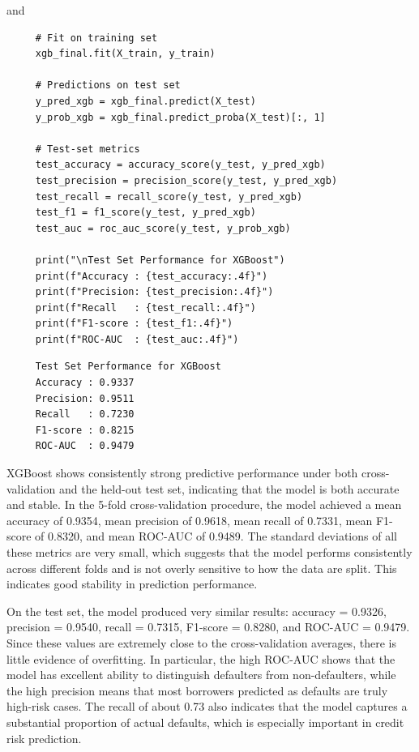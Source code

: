 \documentclass[letterpaper]{article}
\begin{document}
	and 
	
	\begin{lstlisting}
     # Fit on training set
     xgb_final.fit(X_train, y_train)
     
     # Predictions on test set
     y_pred_xgb = xgb_final.predict(X_test)
     y_prob_xgb = xgb_final.predict_proba(X_test)[:, 1]
     
     # Test-set metrics
     test_accuracy = accuracy_score(y_test, y_pred_xgb)
     test_precision = precision_score(y_test, y_pred_xgb)
     test_recall = recall_score(y_test, y_pred_xgb)
     test_f1 = f1_score(y_test, y_pred_xgb)
     test_auc = roc_auc_score(y_test, y_prob_xgb)
     
     print("\nTest Set Performance for XGBoost")
     print(f"Accuracy : {test_accuracy:.4f}")
     print(f"Precision: {test_precision:.4f}")
     print(f"Recall   : {test_recall:.4f}")
     print(f"F1-score : {test_f1:.4f}")
     print(f"ROC-AUC  : {test_auc:.4f}")
	\end{lstlisting}
	
	
	\begin{minipage}{\linewidth}
		\begin{Verbatim}
     Test Set Performance for XGBoost
     Accuracy : 0.9337
     Precision: 0.9511
     Recall   : 0.7230
     F1-score : 0.8215
     ROC-AUC  : 0.9479
		\end{Verbatim}
	\end{minipage}
	XGBoost shows consistently strong predictive performance under both cross-validation and the held-out test set, indicating that the model is both accurate and stable. In the 5-fold cross-validation procedure, the model achieved a mean accuracy of 0.9354, mean precision of 0.9618, mean recall of 0.7331, mean F1-score of 0.8320, and mean ROC-AUC of 0.9489. The standard deviations of all these metrics are very small, which suggests that the model performs consistently across different folds and is not overly sensitive to how the data are split. This indicates good stability in prediction performance.
	
	On the test set, the model produced very similar results: accuracy = 0.9326, precision = 0.9540, recall = 0.7315, F1-score = 0.8280, and ROC-AUC = 0.9479. Since these values are extremely close to the cross-validation averages, there is little evidence of overfitting. In particular, the high ROC-AUC shows that the model has excellent ability to distinguish defaulters from non-defaulters, while the high precision means that most borrowers predicted as defaults are truly high-risk cases. The recall of about 0.73 also indicates that the model captures a substantial proportion of actual defaults, which is especially important in credit risk prediction.
		
\end{document}
